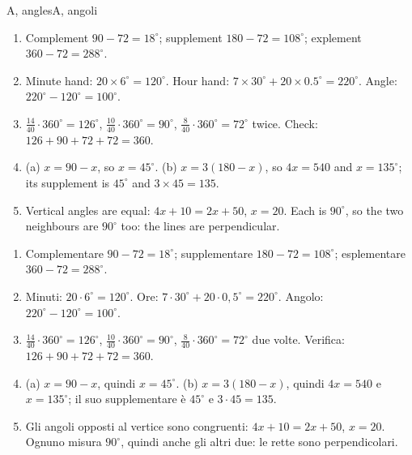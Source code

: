 \label{app:solutions}

\begin{solution}{A, angles}{A, angoli}
\begin{enumerate}[label=\textbf{A\arabic*.}, leftmargin=2.2em]
\item Complement $90 - 72 = 18^\circ$; supplement $180 - 72 = 108^\circ$; explement $360 - 72 = 288^\circ$.
\item Minute hand: $20 \times 6^\circ = 120^\circ$. Hour hand: $7 \times 30^\circ + 20 \times 0.5^\circ = 220^\circ$. Angle: $220^\circ - 120^\circ = 100^\circ$.
\item $\frac{14}{40} \cdot 360^\circ = 126^\circ$, $\frac{10}{40} \cdot 360^\circ = 90^\circ$, $\frac{8}{40} \cdot 360^\circ = 72^\circ$ twice. Check: $126 + 90 + 72 + 72 = 360$.
\item (a) $x = 90 - x$, so $x = 45^\circ$. (b) $x = 3(180 - x)$, so $4x = 540$ and $x = 135^\circ$; its supplement is $45^\circ$ and $3 \times 45 = 135$.
\item Vertical angles are equal: $4x + 10 = 2x + 50$, $x = 20$. Each is $90^\circ$, so the two neighbours are $90^\circ$ too: the lines are perpendicular.
\end{enumerate}
\tcblower
\begin{enumerate}[label=\textbf{A\arabic*.}, leftmargin=2.2em]
\item Complementare $90 - 72 = 18^\circ$; supplementare $180 - 72 = 108^\circ$; esplementare $360 - 72 = 288^\circ$.
\item Minuti: $20 \cdot 6^\circ = 120^\circ$. Ore: $7 \cdot 30^\circ + 20 \cdot 0{,}5^\circ = 220^\circ$. Angolo: $220^\circ - 120^\circ = 100^\circ$.
\item $\frac{14}{40} \cdot 360^\circ = 126^\circ$, $\frac{10}{40} \cdot 360^\circ = 90^\circ$, $\frac{8}{40} \cdot 360^\circ = 72^\circ$ due volte. Verifica: $126 + 90 + 72 + 72 = 360$.
\item (a) $x = 90 - x$, quindi $x = 45^\circ$. (b) $x = 3(180 - x)$, quindi $4x = 540$ e $x = 135^\circ$; il suo supplementare è $45^\circ$ e $3 \cdot 45 = 135$.
\item Gli angoli opposti al vertice sono congruenti: $4x + 10 = 2x + 50$, $x = 20$. Ognuno misura $90^\circ$, quindi anche gli altri due: le rette sono perpendicolari.
\end{enumerate}
\end{solution}

